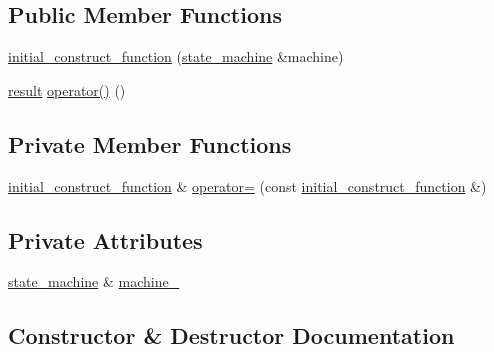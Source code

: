 \subsection*{Public Member Functions}
\begin{DoxyCompactItemize}
\item 
\mbox{\hyperlink{classboost_1_1statechart_1_1state__machine_1_1initial__construct__function_a19740d28b3bcea79463bd7ccd9d65f76}{initial\+\_\+construct\+\_\+function}} (\mbox{\hyperlink{classboost_1_1statechart_1_1state__machine}{state\+\_\+machine}} \&machine)
\item 
\mbox{\hyperlink{namespaceboost_1_1statechart_abe807f6598b614d6d87bb951ecd92331}{result}} \mbox{\hyperlink{classboost_1_1statechart_1_1state__machine_1_1initial__construct__function_a01c69aaf3bd43d6b71a088781b8ee27e}{operator()}} ()
\end{DoxyCompactItemize}
\subsection*{Private Member Functions}
\begin{DoxyCompactItemize}
\item 
\mbox{\hyperlink{classboost_1_1statechart_1_1state__machine_1_1initial__construct__function}{initial\+\_\+construct\+\_\+function}} \& \mbox{\hyperlink{classboost_1_1statechart_1_1state__machine_1_1initial__construct__function_a3f60718222e2814cc1bcce67b2dcad6f}{operator=}} (const \mbox{\hyperlink{classboost_1_1statechart_1_1state__machine_1_1initial__construct__function}{initial\+\_\+construct\+\_\+function}} \&)
\end{DoxyCompactItemize}
\subsection*{Private Attributes}
\begin{DoxyCompactItemize}
\item 
\mbox{\hyperlink{classboost_1_1statechart_1_1state__machine}{state\+\_\+machine}} \& \mbox{\hyperlink{classboost_1_1statechart_1_1state__machine_1_1initial__construct__function_a81fd197badaca00fab741883f2d2b92d}{machine\+\_\+}}
\end{DoxyCompactItemize}


\subsection{Constructor \& Destructor Documentation}
\mbox{\label{classboost_1_1statechart_1_1state__machine_1_1initial__construct__function_a19740d28b3bcea79463bd7ccd9d65f76}} 
